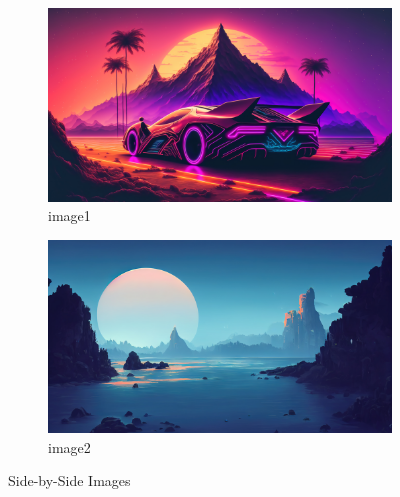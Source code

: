 \documentclass{article}
\begin{document}
	
	\begin{figure}[h]
	\centering
	
		\begin{subfigure}[b]{0.45\textwidth}
			\centering
			\includegraphics[width=\linewidth]{images/image1}
			\caption{image1}
			\label{fig:example-1}
			
		\end{subfigure}
		
		\begin{subfigure}[b]{0.45\textwidth}
			\centering
			\includegraphics[width=\linewidth]{images/image2}
			\caption{image2}
			\label{fig:example-2}
		\end{subfigure}
		
	\caption{Side-by-Side Images}
	
	\end{figure}
	
	
	
\end{document}
